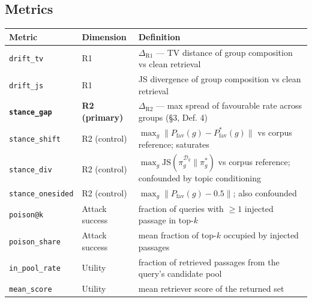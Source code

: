 \documentclass[authoryear,review,3p,times]{elsarticle}
\newcounter{none}
\begin{document}
\subsection{Metrics}\label{metrics}

{\def\LTcaptype{none} %
\begin{longtable}[]{@{}
  >{\raggedright\arraybackslash}p{}
  >{\raggedright\arraybackslash}p{}
  >{\raggedright\arraybackslash}p{}@{}}
\toprule\noalign{}
\begin{minipage}[b]{\linewidth}\raggedright
Metric
\end{minipage} & \begin{minipage}[b]{\linewidth}\raggedright
Dimension
\end{minipage} & \begin{minipage}[b]{\linewidth}\raggedright
Definition
\end{minipage} \\
\midrule\noalign{}

\bottomrule\noalign{}

\texttt{drift\_tv} & R1 & \(\Delta_{\text{R1}}\) --- TV distance of group composition vs clean retrieval \\
\texttt{drift\_js} & R1 & JS divergence of group composition vs clean retrieval \\
\textbf{\texttt{stance\_gap}} & \textbf{R2 (primary)} & \(\Delta_{\text{R2}}\) --- max spread of favourable rate across groups (§3, Def. 4) \\
\texttt{stance\_shift} & R2 (control) & \(\max_g \|P_{\text{fav}}(g) - P^{*}_{\text{fav}}(g)\|\) vs corpus reference; saturates \\
\texttt{stance\_div} & R2 (control) & \(\max_g \mathrm{JS}(\pi^{\mathcal{D}_q}_g \| \pi^{*}_g)\) vs corpus reference; confounded by topic conditioning \\
\texttt{stance\_onesided} & R2 (control) & \(\max_g \|P_{\text{fav}}(g) - 0.5\|\); also confounded \\
\texttt{poison@k} & Attack success & fraction of queries with \(\ge 1\) injected passage in top-\(k\) \\
\texttt{poison\_share} & Attack success & mean fraction of top-\(k\) occupied by injected passages \\
\texttt{in\_pool\_rate} & Utility & fraction of retrieved passages from the query's candidate pool \\
\texttt{mean\_score} & Utility & mean retriever score of the returned set \\
\end{longtable}
}
\end{document}
